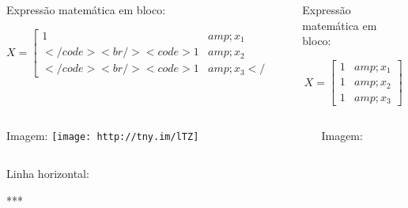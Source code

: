 \documentclass[
]{book}
\begin{document}
\begin{columns}

\begin{column}

Expressão matemática em bloco:

\[X = \begin{bmatrix}1 &amp; x_{1}\\</code><br />
<code>1 &amp; x_{2}\\</code><br />
<code>1 &amp; x_{3}</code><br />
<code>\end{bmatrix}\]

\end{column}

\begin{column}

~

\end{column}

\begin{column}

Expressão matemática em bloco:

{\[X = \begin{bmatrix}1 &amp; x_{1}\\
1 &amp; x_{2}\\
1 &amp; x_{3}
\end{bmatrix}\]}

\end{column}

\end{columns}

\begin{columns}

\begin{column}

Imagem: \texttt{[image: http://tny.im/lTZ]}

\end{column}

\begin{column}

~

\end{column}

\begin{column}

Imagem:

\end{column}

\end{columns}

\begin{column}

Linha horizontal:

***

\end{column}
\end{document}
